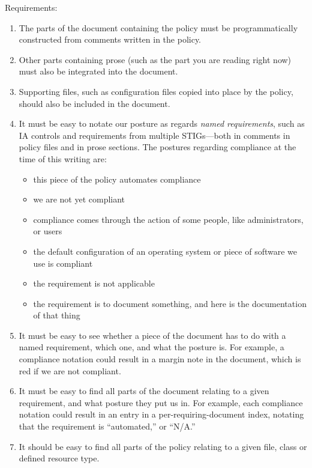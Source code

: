 Requirements:

\begin{enumerate}
\item The parts of the document containing the policy must be
programmatically constructed from comments written in the policy.

\item Other parts containing prose (such as the part you are reading right
now) must also be integrated into the document.

\item Supporting files, such as configuration files copied into place by
the policy, should also be included in the document.

\item It must be easy to notate our posture as regards \emph{named
requirements}, such as IA controls and requirements from multiple
STIGs---both in comments in policy files and in prose sections. The
postures regarding compliance at the time of this writing are:
    \begin{itemize}
    \item this piece of the policy automates compliance
    \item we are not yet compliant
    \item compliance comes through the action of some people, like
    administrators, or users
    \item the default configuration of an operating system or piece of
    software we use is compliant
    \item the requirement is not applicable
    \item the requirement is to document something, and here is the
    documentation of that thing
    \end{itemize}

\item It must be easy to see whether a piece of the document has to do
with a named requirement, which one, and what the posture is. For example,
a compliance notation could result in a margin note in the document, which
is red if we are not compliant.

\item It must be easy to find all parts of the document relating to a
given requirement, and what posture they put us in. For example, each
compliance notation could result in an entry in a per-requiring-document
index, notating that the requirement is ``automated,'' or ``N/A.''

\item It should be easy to find all parts of the policy relating to a
given file, class or defined resource type.


\end{enumerate}
